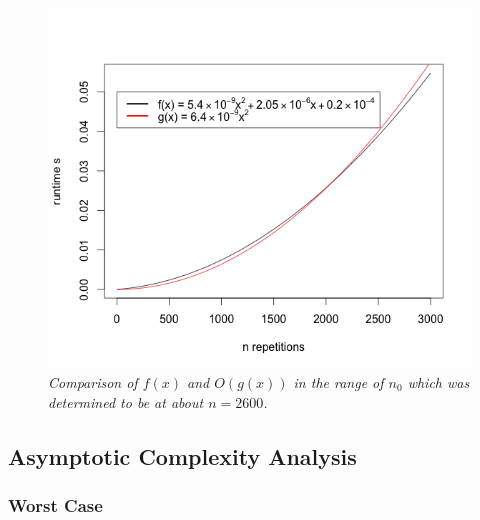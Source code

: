 \documentclass[a4paper,11pt,twoside]{article}
\begin{document}
\begin{figure} 
\includegraphics[width=\textwidth]{ordo.png}
\caption{\textit{Comparison of $f(x)$ and $O(g(x))$ in the range of $n_{0}$
  which was determined to be at about $n = 2600$.}}
\label{fig:ordo}
\end{figure}

\subsection{Asymptotic Complexity Analysis}
\subsubsection{Worst Case}
\end{document}
